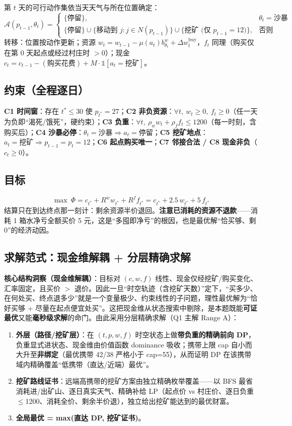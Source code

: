 \documentclass[12pt,a4paper]{ctexart}
\begin{document}
第 $t$ 天的可行动作集依当天天气与所在位置确定：
\[
\mathcal{A}(p_{t-1},\theta_t)=
\begin{cases}
\{\text{停留}\}, & \theta_t=\text{沙暴}\\
\{\text{停留}\}\cup\{\text{移动到 }j: j\in N(p_{t-1})\}\cup\{\text{挖矿 (仅 }p_{t-1}{=}12)\}, & \text{否则}
\end{cases}
\]
转移：位置按动作更新；资源 $w_t=w_{t-1}-\mu(a_t)b^w_{\theta_t}+\Delta w^{\text{buy}}_t$，$f_t$ 同理（购买仅在第 0 天起点或经过村庄时 $>0$）；现金 $c_t=c_{t-1}-(\text{购买花费})+M\cdot\mathbb{1}[a_t=\text{挖矿}]$。

\subsection{约束（全程逐日）}

\textbf{C1 时间窗}：存在 $t^*\le 30$ 使 $p_{t^*}=27$；\textbf{C2 非负资源}：$\forall t,\ w_t\ge0,\ f_t\ge0$（任一天为负即“渴死/饿死”，硬约束）；\textbf{C3 负重}：$\forall t,\ \rho_w w_t+\rho_f f_t\le 1200$（每一时刻，含购买后）；\textbf{C4 沙暴必停}：$\theta_t=\text{沙暴}\Rightarrow a_t=\text{停留}$；\textbf{C5 挖矿地点}：$a_t=\text{挖矿}\Rightarrow p_{t-1}=p_t=12$；\textbf{C6 起点购买唯一}；\textbf{C7 邻接合法 / C8 现金非负}（$c_t\ge0$）。

\subsection{目标}

\[\max\ \Phi=c_{t^*}+R^w w_{t^*}+R^f f_{t^*}=c_{t^*}+2.5\,w_{t^*}+5\,f_{t^*}\]
结算只在到达终点那一刻计：剩余资源半价退回。\textbf{注意已消耗的资源不退款}——消耗 1 箱水净亏全额买价 5 元，这是“多囤即净亏”的根因，也是最优解“恰买够、剩 0”的经济动因。

\subsection{求解范式：现金维解耦 + 分层精确求解}

\textbf{核心结构洞察（现金维解耦）}：目标对 $(c,w,f)$ 线性、现金仅经挖矿/购买变化、汇率固定，且买价 $>$ 退价。因此一旦“时空轨迹（含挖矿天数）”定下，“买多少、在何处买、终点退多少”就是一个变量极少、约束线性的子问题，理性最优解为“恰好买够 + 尽量在起点便宜处买”。这把现金维从状态搜索中剔除，是本题既能\textbf{可证最优}又能\textbf{毫秒级求解}的命门。由此采用分层精确求解（Q1 主解 Range A）：

\begin{enumerate}
  \item \textbf{外层（路径/挖矿层）}：在 $(t,p,w,f)$ 时空状态上做\textbf{带负重的精确前向 DP}，负重显式进状态、现金维由价值函数 dominance 吸收；携带上限 cap 自小而大升至\textbf{非绑定}（最优携带 42/38 严格小于 cap=55），从而证明 DP 在该携带域内精确覆盖“低携带（直达/近端）最优”。
  \item \textbf{挖矿路线证书}：远端高携带的挖矿方案由独立精确枚举覆盖——以 BFS 最省消耗进/出矿山、逐日真实天气、精确补给 LP（起点价 vs 村庄价、逐日负重 $\le$1200、消耗全价、剩余半价退），独立给出挖矿能达到的最优财富。
  \item \textbf{全局最优 = max(直达 DP, 挖矿证书)}。
\end{enumerate}
\end{document}
